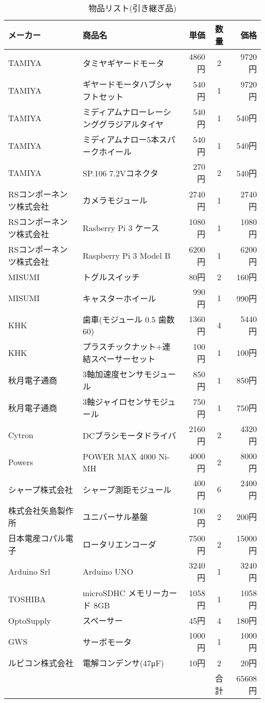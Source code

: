 \begin{table}[H]
\begin{center}
  \caption{物品リスト(引き継ぎ品)}
 \label{tab:list1}
  \begin{tabular}{|l|l|r|c|r|}  \hline
   メーカー & 商品名 & 単価 & 数量 & 価格 \\ \hline \hline 
   TAMIYA & タミヤギヤードモータ & 4860円 & 2 & 9720円  \\     \hline
   TAMIYA & ギヤードモータハブシャフトセット & 540円 & 1 & 9720円   \\  \hline
   TAMIYA & ミディアムナローレーシンググラジアルタイヤ & 540円 & 1 & 540円  \\  \hline
   TAMIYA & ミディアムナロー5本スパークホイール & 540円 & 1 & 540円   \\     \hline
   TAMIYA & SP.106 7.2Vコネクタ & 270円 & 2 & 540円  \\      \hline
   RSコンポーネンツ株式会社 & カメラモジュール &  2740円 & 1 & 2740円  \\ \hline
   RSコンポーネンツ株式会社 & Rasberry Pi 3 ケース & 1080円 & 1 & 1080円  \\    \hline
   RSコンポーネンツ株式会社 & Raspberry Pi 3 Model B & 6200円 & 1 & 6200円  \\     \hline
   MISUMI & トグルスイッチ & 80円 & 2 & 160円 \\       \hline
   MISUMI & キャスターホイール & 990円 & 1 & 990円 \\     \hline
   KHK & 歯車(モジュール 0.5 歯数60) &1360円 & 4 & 5440円 \\      \hline
   KHK & プラスチックナット+連結スペーサーセット & 100円 & 1 & 100円  \\      \hline
   秋月電子通商 & 3軸加速度センサモジュール & 850円 & 1 & 850円  \\     \hline
   秋月電子通商 & 3軸ジャイロセンサモジュール & 750円  & 1 & 750円 \\     \hline
   Cytron &DCブラシモータドライバ & 2160円 & 2 & 4320円 \\       \hline
   Powers & POWER MAX 4000 Ni-MH& 4000円 & 2 & 8000円  \\     \hline
   シャープ株式会社 & シャープ測距モジュール & 400円 & 6 & 2400円  \\    \hline
   株式会社矢島製作所 & ユニバーサル基盤 & 100円 & 2 & 200円 \\    \hline
   日本電産コパル電子 & ロータリエンコーダ & 7500円 & 2 & 15000円  \\   \hline
   Arduino Srl & Arduino UNO & 3240円 & 1 & 3240円  \\     \hline
   TOSHIBA & microSDHC メモリーカード 8GB & 1058円 & 1 & 1058円  \\    \hline
   OptoSupply & スペーサー & 45円 & 4 & 180円  \\     \hline
   GWS &サーボモータ & 1000円 & 1 & 1000円  \\    \hline
   ルビコン株式会社 & 電解コンデンサ(47μF) & 10円 & 2 &20円 \\     \hline
 &  & &合計 & 65608円  \\   \hline
 \end{tabular}
\end{center}
\end{table}

